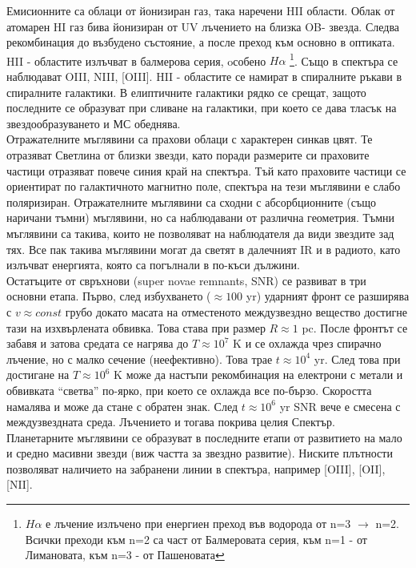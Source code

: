 \documentclass[a4paper,12pt]{article}
\begin{document}
Емисионните са облаци от йонизиран газ, така наречени HII области. Облак от атомарен HI газ бива йонизиран от UV лъчението на близка OB- звезда. Следва рекомбинация до възбудено състояние, а после преход към основно в оптиката. HII - областите излъчват в балмерова серия, oсобено $H\alpha$ \footnote{$H\alpha$ е лъчение излъчено при енергиен преход във водорода от n=3 $\rightarrow$ n=2. Всички преходи към n=2 са част от Балмеровата серия, към n=1 - от Лимановата, към n=3 - от Пашеновата}. Също в спектъра се наблюдават OIII, NIII, [OIII]. HII - областите се намират в спиралните ръкави в спиралните галактики. В елиптичните галактики рядко се срещат, защото последните се образуват при сливане на галактики, при което се дава тласък на звездообразуването и МС обеднява.\\

Отражателните мъглявини са прахови облаци с характерен синкав цвят. Те отразяват Светлина от близки звезди, като поради размерите си праховите частици отразяват повече синия край на спектъра. Тъй като праховите частици се ориентират по галактичното магнитно поле, спектъра на тези мъглявини е слабо поляризиран. Отражателните мъглявини са сходни с абсорбционните (също наричани тъмни) мъглявини, но са наблюдавани от различна геометрия. Тъмни мъглявини са такива, които не позволяват на наблюдателя да види звездите зад тях. Все пак такива мъглявини могат да светят в далечният IR и в радиото, като излъчват енергията, която са погълнали в по-къси дължини.\\

Остатъците от свръхнови (super novae remnants, SNR) се развиват в три основни етапа. Първо, след избухването ($\approx 100$ yr) ударният фронт се разширява с $v \approx const$ грубо докато масата на отместеното междузвездно вещество достигне тази на изхвърлената обвивка. Това става при размер $R \approx 1$ pc. После фронтът се забавя и затова средата се нагрява до $T \approx 10^7$ K и се охлажда чрез спирачно лъчение, но с малко сечение (неефективно). Това трае $t \approx 10^4$ yr. След това при достигане на $T \approx 10^6$ K може да настъпи рекомбинация на електрони с метали и обвивката ``светва'' по-ярко, при което се охлажда все по-бързо. Скоростта намалява и може да стане с обратен знак. След $t \approx 10^6$ yr SNR вече е смесена с междузвездната среда. Лъчението и тогава покрива целия Спектър.\\

Планетарните мъглявини се образуват в последните етапи от развитието на мало и средно масивни звезди (виж частта за звездно развитие). Ниските плътности позволяват наличието на забранени линии в спектъра, например [OIII], [OII], [NII].\\
\end{document}
